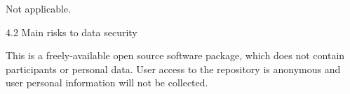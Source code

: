 \documentclass[a4paper,11pt]{article}
\begin{document}
Not applicable.

4.2	Main risks to data security

This is a freely-available open source software package, which does not contain participants or personal data.   User access to the repository is anonymous and user personal information will not be collected. 
\end{document}
